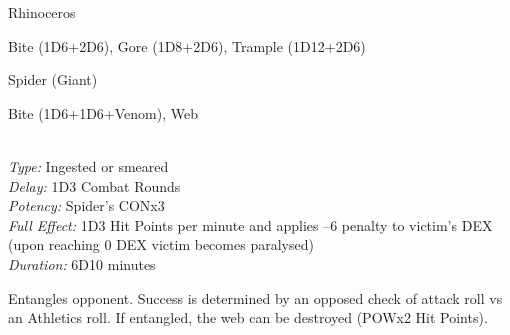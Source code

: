 \begin{samepage}
\begin{monsterbox}{Rhinoceros}
	\basics[%
        hitpoints  = 19, 
	majorwound = 10,
	damagemodifier = +2D6,
	powerpoints = 11,
	movementrate = 23m,
	armor = Thick hide (5 AP),
	]
	\rpghline%
	\stats[ %
		STR = 2D6+21 (26),
		CON = 3D6    (11),
		DEX = 2D6    (7),
		SIZ = 2D6+21 (26),
		INT = 3      (3),
		POW = 3D6    (11),
		CHA = 3      (3)
	]
	\rpghline%
	\begin{rpg-monsteraction}
		Bite (1D6+2D6), Gore (1D8+2D6), Trample (1D12+2D6)
	\end{rpg-monsteraction}
\end{monsterbox}
\end{samepage}


\begin{samepage}
\begin{monsterbox}{Spider (Giant)}
	\basics[%
        hitpoints  = 22, 
	majorwound = 11,
	damagemodifier = +1D6,
	powerpoints = 11,
	movementrate = {15m on land, 23m in web},
	armor = Chitin (4 AP),
	]
	\rpghline%
	\stats[ %
		STR = 2D6+12 (19),
		CON = 3D6+6  (17),
		DEX = 2D6+9  (16),
		SIZ = 4D6+12 (26),
		INT = 8      (8),
		POW = 3D6    (11),
		CHA = 2      (2)
	]
	\rpghline%
	\begin{rpg-monsteraction}
		Bite (1D6+1D6+Venom), Web
	\end{rpg-monsteraction}
	\begin{rpg-monsteraction}\\
		\textit{Type:} Ingested or smeared\\
		\textit{Delay:} 1D3 Combat Rounds\\
		\textit{Potency:} Spider's CONx3\\
		\textit{Full Effect:} 1D3 Hit Points per minute and applies –6 penalty to victim’s DEX (upon reaching 0 DEX victim becomes paralysed)\\ 
		\textit{Duration:} 6D10 minutes
	\end{rpg-monsteraction}
	\begin{rpg-monsteraction}[Web]
		Entangles opponent. Success is determined by an opposed check of attack roll vs an Athletics roll. If entangled, the web can be destroyed (POWx2 Hit Points).
	\end{rpg-monsteraction}


\end{monsterbox}
\end{samepage}

